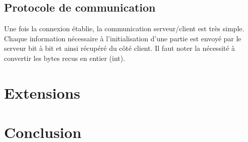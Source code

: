 \documentclass{article}
\begin{document}
	\subsection{Protocole de communication}
	Une fois la connexion \'etablie, la communication serveur/client est tr\`es simple.
	Chaque information n\'ecessaire \`a l'initialisation d'une partie est envoy\'e par le serveur bit \`a bit et ainsi r\'ecup\'er\'e du c\^ot\'e client.
	Il faut noter la n\'ecessit\'e \`a convertir les bytes recus en entier (int).

\section{Extensions}

\section{Conclusion}
\end{document}
